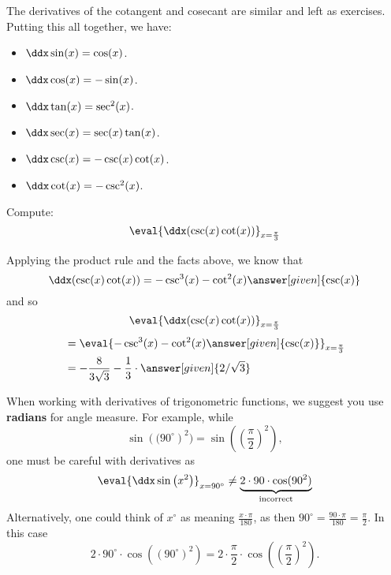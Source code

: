 \documentclass{ximera}
\begin{document}
The derivatives of the cotangent and cosecant are similar and left as
exercises.  Putting this all together, we have:

\begin{theorem} \hfil
	\begin{itemize}
		\item $\ddx \sin(x) = \cos(x)$.
		\item $\ddx \cos(x) = -\sin(x)$.
		\item $\ddx \tan(x) = \sec^2(x)$.
		\item $\ddx \sec(x) = \sec(x)\tan(x)$.
		\item $\ddx \csc(x) = -\csc(x)\cot(x)$.
		\item $\ddx \cot(x) = -\csc^2(x)$.
	\end{itemize}
\end{theorem}

\begin{example}
Compute:
\[
\eval{\ddx ( \csc(x) \cot(x) )}_{x=\frac{\pi}{3}}
\]
\begin{explanation}
Applying the product rule and the facts above, we know that
\[
\ddx ( \csc(x) \cot(x) ) = - \csc^3(x) - \cot^2(x)\answer[given]{\csc(x)}
\]
and so
\[
\eval{\ddx ( \csc(x) \cot(x) )}_{x=\frac{\pi}{3}}
\]
\begin{align*}
  &= \eval{  - \csc^3(x) - \cot^2(x) \answer[given]{\csc(x)}}_{x=\frac{\pi}{3}}  \\
&= - \frac{8}{3 \sqrt{3}} - \frac{1}{3}\cdot \answer[given]{2/\sqrt{3}}
\end{align*}
\end{explanation}
\end{example}


\begin{warning}
When working with derivatives of trigonometric functions, we suggest
you use \textbf{radians} for angle measure. For example, while
\[
\sin\left((90^\circ\right)^2) = \sin\left(\left(\frac{\pi}{2}\right)^2\right),
\]
one must be careful with derivatives as
\[
\eval{\ddx \sin\left(x^2\right)}_{x=90^\circ} \ne \underbrace{2\cdot 90\cdot \cos(90^2)}_{\text{incorrect}}
\]
Alternatively, one could think of $x^\circ$ as meaning
$\frac{x\cdot\pi}{180}$, as then $90^\circ = \frac{90\cdot\pi}{180} =
\frac{\pi}{2}$. In this case
\[
2\cdot 90^\circ\cdot \cos((90^\circ)^2) = 2\cdot \frac{\pi}{2}\cdot\cos\left(\left(\frac{\pi}{2}\right)^2\right).
\]
\end{warning}
\end{document}
